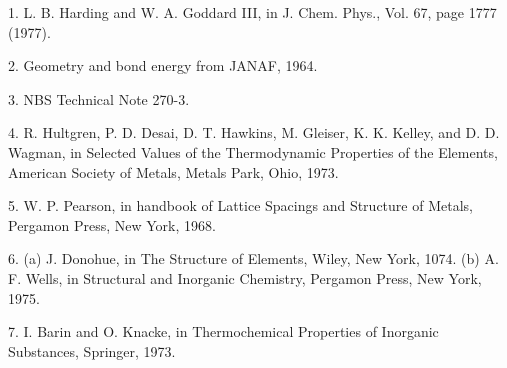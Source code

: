 \bigskip


\item {1.} L. B. Harding and W. A. Goddard III, in J. Chem. Phys., Vol. 
67, page 1777 (1977).  

\item {2.} Geometry and bond energy from JANAF, 1964.

\item {3.} NBS Technical Note 270-3.

\item {4.} R. Hultgren, P. D. Desai, D. T. Hawkins, M. Gleiser, K. K. 
Kelley, and D. D. Wagman, in Selected Values of the Thermodynamic 
Properties of the Elements, American Society of Metals, Metals Park, 
Ohio, 1973.

\item {5.} W. P. Pearson, in handbook of Lattice Spacings and 
Structure of Metals, Pergamon Press, New York, 1968.

\item {6.} (a) J. Donohue, in The Structure of Elements, Wiley, New 
York, 1074.  (b) A. F. Wells, in Structural and Inorganic Chemistry, 
Pergamon Press, New York, 1975.

\item {7.} I. Barin and O. Knacke, in Thermochemical Properties of 
Inorganic Substances, Springer, 1973.

\bigskip

